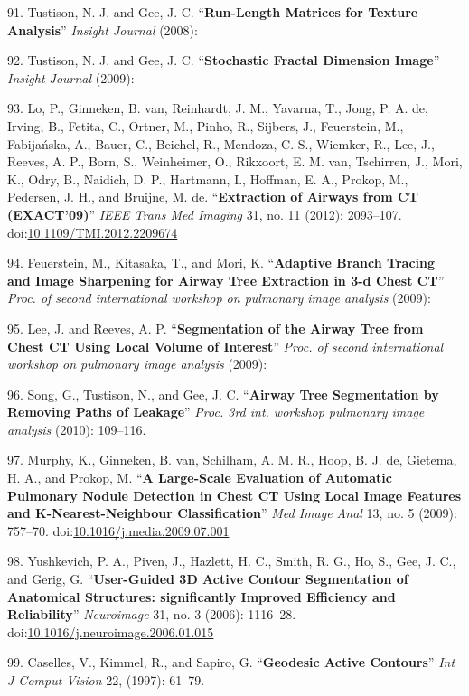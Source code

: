 \documentclass[11pt,]{article}
\begin{document}
91. Tustison, N. J. and Gee, J. C. ``\textbf{Run-Length Matrices for
Texture Analysis}'' \emph{Insight Journal} (2008):

92. Tustison, N. J. and Gee, J. C. ``\textbf{Stochastic Fractal
Dimension Image}'' \emph{Insight Journal} (2009):

93. Lo, P., Ginneken, B. van, Reinhardt, J. M., Yavarna, T., Jong, P. A.
de, Irving, B., Fetita, C., Ortner, M., Pinho, R., Sijbers, J.,
Feuerstein, M., Fabija{ń}ska, A., Bauer, C., Beichel, R., Mendoza, C.
S., Wiemker, R., Lee, J., Reeves, A. P., Born, S., Weinheimer, O.,
Rikxoort, E. M. van, Tschirren, J., Mori, K., Odry, B., Naidich, D. P.,
Hartmann, I., Hoffman, E. A., Prokop, M., Pedersen, J. H., and Bruijne,
M. de. ``\textbf{Extraction of Airways from CT (EXACT'09)}'' \emph{IEEE
Trans Med Imaging} 31, no. 11 (2012): 2093--107.
doi:\href{http://dx.doi.org/10.1109/TMI.2012.2209674}{10.1109/TMI.2012.2209674}

94. Feuerstein, M., Kitasaka, T., and Mori, K. ``\textbf{Adaptive Branch
Tracing and Image Sharpening for Airway Tree Extraction in 3-d Chest
CT}'' \emph{Proc. of second international workshop on pulmonary image
analysis} (2009):

95. Lee, J. and Reeves, A. P. ``\textbf{Segmentation of the Airway Tree
from Chest CT Using Local Volume of Interest}'' \emph{Proc. of second
international workshop on pulmonary image analysis} (2009):

96. Song, G., Tustison, N., and Gee, J. C. ``\textbf{Airway Tree
Segmentation by Removing Paths of Leakage}'' \emph{Proc. 3rd int.
workshop pulmonary image analysis} (2010): 109--116.

97. Murphy, K., Ginneken, B. van, Schilham, A. M. R., Hoop, B. J. de,
Gietema, H. A., and Prokop, M. ``\textbf{A Large-Scale Evaluation of
Automatic Pulmonary Nodule Detection in Chest CT Using Local Image
Features and K-Nearest-Neighbour Classification}'' \emph{Med Image Anal}
13, no. 5 (2009): 757--70.
doi:\href{http://dx.doi.org/10.1016/j.media.2009.07.001}{10.1016/j.media.2009.07.001}

98. Yushkevich, P. A., Piven, J., Hazlett, H. C., Smith, R. G., Ho, S.,
Gee, J. C., and Gerig, G. ``\textbf{User-Guided 3D Active Contour
Segmentation of Anatomical Structures: significantly Improved Efficiency
and Reliability}'' \emph{Neuroimage} 31, no. 3 (2006): 1116--28.
doi:\href{http://dx.doi.org/10.1016/j.neuroimage.2006.01.015}{10.1016/j.neuroimage.2006.01.015}

99. Caselles, V., Kimmel, R., and Sapiro, G. ``\textbf{Geodesic Active
Contours}'' \emph{Int J Comput Vision} 22, (1997): 61--79.
\end{document}
